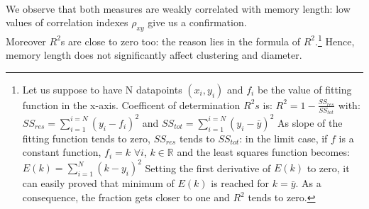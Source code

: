 \\
We observe that both measures are weakly correlated with
memory length: low values of correlation indexes
$\rho_{xy}$ give us a confirmation.\\
Moreover $R^2$s are close to zero too: the reason lies in the  formula
of $R^2$.\footnote{Let us suppose to have N datapoints
$(x_i,y_i)$ and $f_i$ be the
value of fitting function in the x-axis. Coefficent of determination
$R^2s$ is: $R^{2}= 1-{\frac {SS_{ res}}  {SS_{ tot}}}$
with:
$SS_{ res}=\sum_{i=1}^{i=N}{(y_i - f_i)^2}$
and
$SS_{ tot}=\sum_{i=1}^{i=N}{(y_i - \bar{y})^2}$
As slope of the fitting function tends to zero, $SS_{res}$ tends
to $SS_{tot}$: in the limit case, if $f$ is a constant function,
$f_i=k$ $\forall  i$,  $k \in  \mathbb{R}$ and the least
squares function becomes: $E(k)= \sum_{i=1}^{N}{(k-y_i)^2} $
Setting the first derivative of $E(k)$ to zero, it can easily proved
that minimum of $E(k)$ is reached for $k=\bar{y}$.
As a consequence, the fraction gets closer to one and $R^2$ tends to zero.}
Hence, memory length does not significantly affect clustering and diameter.
